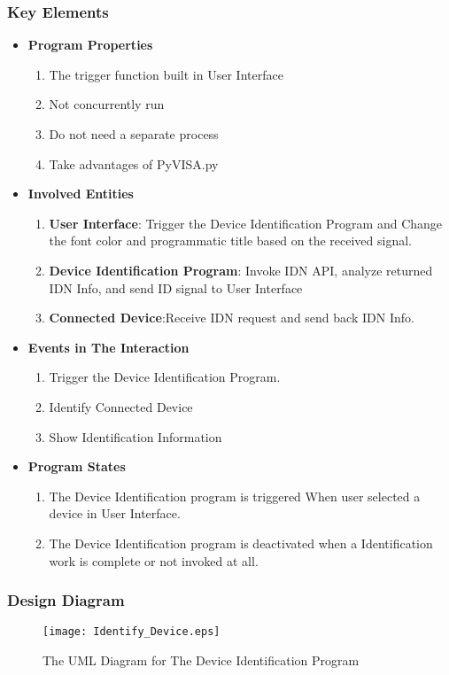 \documentclass [10pt]{article}
\begin{document}
\subsubsection{Key Elements}
\begin{itemize}
\item \textbf{Program Properties}
	\begin{enumerate}
	\item The trigger function built in User Interface 
    \item Not concurrently run
    \item Do not need a separate process
    \item Take advantages of PyVISA.py
    \end{enumerate}
\item \textbf{Involved Entities}
    \begin{enumerate}
    \item \textbf{User Interface}: Trigger the Device Identification Program and Change the font color and programmatic title based on the received signal.
    \item \textbf{Device Identification Program}: Invoke IDN API, analyze returned IDN Info, and send ID signal to User Interface   
    \item \textbf{Connected Device}:Receive IDN request and send back IDN Info. 
    \end{enumerate}	
\item \textbf{Events in The Interaction}
    \begin{enumerate}
    \item Trigger the Device Identification Program.
    \item Identify Connected Device
    \item Show Identification Information
    \end{enumerate}
\item \textbf{Program States}
	\begin{enumerate}
	\item The Device Identification program is triggered When user selected a device in User Interface.
    \item The Device Identification program is deactivated when a Identification work is complete or not invoked at all.
	\end{enumerate}
\end{itemize}
\subsubsection{Design Diagram}
\begin{figure}[ht]
\centering
\texttt{[image: Identify\_Device.eps]}
\caption{The UML Diagram for The Device Identification Program}
\end{figure}
\pagebreak
\end{document}

